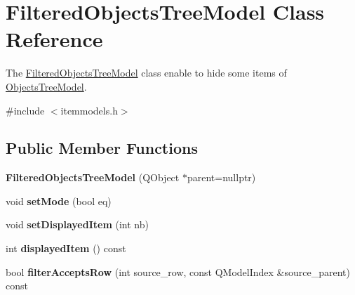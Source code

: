 \hypertarget{class_filtered_objects_tree_model}{\section{\-Filtered\-Objects\-Tree\-Model \-Class \-Reference}
\label{class_filtered_objects_tree_model}
}


\-The \hyperlink{class_filtered_objects_tree_model}{\-Filtered\-Objects\-Tree\-Model} class enable to hide some items of \hyperlink{class_objects_tree_model}{\-Objects\-Tree\-Model}.  




{\ttfamily \#include $<$itemmodels.\-h$>$}

\subsection*{\-Public \-Member \-Functions}
\begin{DoxyCompactItemize}
\item 
\hypertarget{class_filtered_objects_tree_model_a6b637cef0867000ea45adec36939da85}{{\bfseries \-Filtered\-Objects\-Tree\-Model} (\-Q\-Object $\ast$parent=nullptr)}\label{class_filtered_objects_tree_model_a6b637cef0867000ea45adec36939da85}

\item 
\hypertarget{class_filtered_objects_tree_model_a6720f6d03ccffbea1606d95219ab34be}{void {\bfseries set\-Mode} (bool eq)}\label{class_filtered_objects_tree_model_a6720f6d03ccffbea1606d95219ab34be}

\item 
\hypertarget{class_filtered_objects_tree_model_a2b1a0aaf119ee7c0eac3e7b699244170}{void {\bfseries set\-Displayed\-Item} (int nb)}\label{class_filtered_objects_tree_model_a2b1a0aaf119ee7c0eac3e7b699244170}

\item 
\hypertarget{class_filtered_objects_tree_model_add7fb4d2772a8625697c9769c0478155}{int {\bfseries displayed\-Item} () const }\label{class_filtered_objects_tree_model_add7fb4d2772a8625697c9769c0478155}

\item 
\hypertarget{class_filtered_objects_tree_model_a0038c4fd8056ae20be41d7911d578b6d}{bool {\bfseries filter\-Accepts\-Row} (int source\-\_\-row, const \-Q\-Model\-Index \&source\-\_\-parent) const }\label{class_filtered_objects_tree_model_a0038c4fd8056ae20be41d7911d578b6d}

\end{DoxyCompactItemize}


